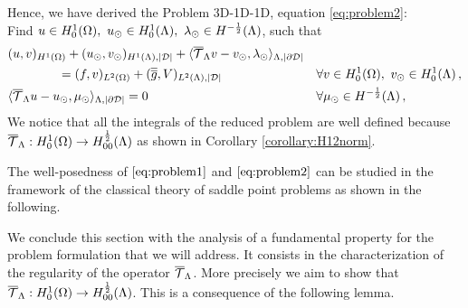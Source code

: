 \documentclass[r]{siamart171218}
\begin{document}
Hence, we have derived the Problem 3D-1D-1D, equation \eqref{eq:problem2}: \\ 
Find $u \in H^1_0(\Omega),\ u_{\odot} \in H^1_0(\Lambda), \ \lambda_{\odot} \in H^{-\frac 1 2}(\Lambda)$, such that
\begin{subequations}
\begin{align*}
&(u,v)_{H^1(\Omega)} + (u_{\odot},v_{\odot})_{H^1(\Lambda),|\mathcal{D}|} 
+  \langle {\overline{\mathcal{T}}_\Lambda} v - v_{\odot}, \lambda_{\odot} \rangle_{\Lambda, |\partial\mathcal{D}|} &&
\\
\nonumber
&\qquad\qquad= (f,v)_{L^2(\Omega)} +  (\overline{\overline{g}},V)_{L^2(\Lambda),|\mathcal{D}|}
\quad && \forall v \in H^1_0(\Omega), \ v_{\odot} \in H^1_0(\Lambda)\,,
\\
& \langle {\overline{\mathcal{T}}_\Lambda} u -   u_{\odot}, \mu_{\odot} \rangle_{\Lambda,|\partial\mathcal{D}|} = 0
\quad &&\forall \mu_{\odot} \in H^{-\frac 1 2}(\Lambda)\,,
\end{align*}
\end{subequations}
We notice that all the integrals of the reduced problem are well defined because 
${\overline{\mathcal{T}}_\Lambda}: H^1_0(\Omega) \rightarrow H^\frac 1 2_{00}(\Lambda)$ as shown in Corollary \ref{corollary:H12norm}.

The well-posedness of $\eqref{eq:problem1}$ and $\eqref{eq:problem2}$ 
can be studied in the framework of the classical theory of saddle point problems as shown in the following.


We conclude this section with the analysis of a fundamental property for the problem formulation that we will address.
It consists in the characterization of the regularity of the operator ${\overline{\mathcal{T}}_\Lambda}$.
More precisely we aim to show that ${\overline{\mathcal{T}}_\Lambda}: H^1_0(\Omega) \rightarrow H^\frac 1 2_{00}(\Lambda)$.
This is a consequence of the following lemma.







%












\appendix

\end{document}
